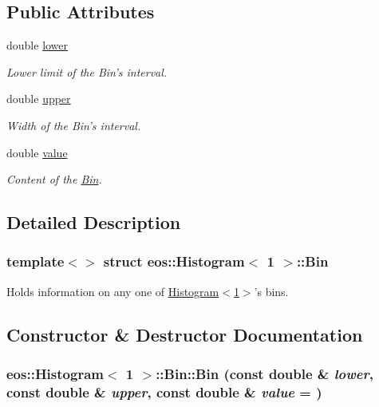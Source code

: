 \subsection*{Public Attributes}
\begin{DoxyCompactItemize}
\item 
double \hyperlink{structeos_1_1Histogram_3_011_01_4_1_1Bin_a1b79f2bf22a180397c8ce9d344e4eabf}{lower}
\begin{DoxyCompactList}\small\item\em Lower limit of the Bin's interval. \item\end{DoxyCompactList}\item 
double \hyperlink{structeos_1_1Histogram_3_011_01_4_1_1Bin_ab83ca1387607899b43e21d21acb0e38d}{upper}
\begin{DoxyCompactList}\small\item\em Width of the Bin's interval. \item\end{DoxyCompactList}\item 
double \hyperlink{structeos_1_1Histogram_3_011_01_4_1_1Bin_aed7930bf76124d4d4e3d347419890339}{value}
\begin{DoxyCompactList}\small\item\em Content of the \hyperlink{structeos_1_1Histogram_3_011_01_4_1_1Bin}{Bin}. \item\end{DoxyCompactList}\end{DoxyCompactItemize}


\subsection{Detailed Description}
\subsubsection*{template$<$$>$ struct eos::Histogram$<$ 1 $>$::Bin}

Holds information on any one of \hyperlink{classeos_1_1Histogram_3_011_01_4}{Histogram$<$1$>$}'s bins. 

\subsection{Constructor \& Destructor Documentation}
\hypertarget{structeos_1_1Histogram_3_011_01_4_1_1Bin_a017fce44f09224396431178d57aaa114}{
\subsubsection[{Bin}]{\setlength{\rightskip}{0pt plus 5cm}eos::Histogram$<$ 1 $>$::Bin::Bin (const double \& {\em lower}, \/  const double \& {\em upper}, \/  const double \& {\em value} = {})}}
\label{structeos_1_1Histogram_3_011_01_4_1_1Bin_a017fce44f09224396431178d57aaa114}


